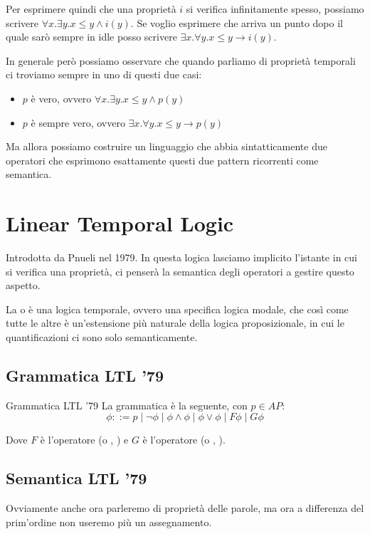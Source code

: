 Per esprimere quindi che una proprietà \(i\) si verifica infinitamente spesso, possiamo scrivere \(\forall x. \exists y. x \leq y \land i(y)\).
Se voglio esprimere che arriva un punto dopo il quale sarò sempre in idle posso scrivere \(\exists x. \forall y. x \leq y \to i(y)\).

In generale però possiamo osservare che quando parliamo di proprietà temporali ci troviamo sempre in uno di questi due casi:
\begin{itemize}
  \item {} \(p\) è vero, ovvero \(\forall x.\exists y. x \leq y \land p(y)\)
  \item {} \(p\) è sempre vero, ovvero \(\exists x. \forall y. x \leq y \to p(y)\)
\end{itemize}

Ma allora possiamo costruire un linguaggio che abbia sintatticamente due operatori che esprimono esattamente questi due pattern ricorrenti come semantica.

\section{Linear Temporal Logic}

Introdotta da Pnueli nel 1979. In questa logica lasciamo implicito l'istante in cui si verifica una proprietà, ci penserà la semantica degli operatori a gestire questo aspetto.

La  o  è una logica temporale, ovvero una specifica logica modale, che così come tutte le altre è un'estensione più naturale della logica proposizionale, in cui le quantificazioni ci sono solo semanticamente.

\subsection{Grammatica LTL '79}

\begin{definition}{Grammatica LTL '79}
  La grammatica è la seguente, con \(p \in AP\):
  \[\phi ::= p \mid \neg \phi \mid \phi \land \phi \mid \phi \lor \phi \mid F\phi \mid G\phi\]
\end{definition}

Dove \(F\) è l'operatore  (o , ) e \(G\) è l'operatore  (o , ).

\subsection{Semantica LTL '79}
Ovviamente anche ora parleremo di proprietà delle parole, ma ora a differenza del prim'ordine non useremo più un assegnamento.

